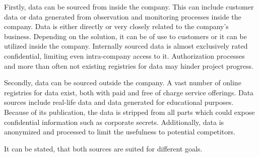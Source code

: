 	Firstly, data can be sourced from inside the company. This can include customer data or data generated from observation and monitoring processes inside the company. Data is either directly or very closely related to the company's business. Depending on the solution, it can be of use to customers or it can be utilized inside the company. Internally sourced data is almost exclusively rated confidential, limiting even intra-company access to it. Authorization processes and more than often not existing registries for data may hinder project progress.
	
	Secondly, data can be sourced outside the company. A vast number of online registries for data exist, both with paid and free of charge service offerings. Data sources include real-life data and data generated for educational purposes. Because of its publication, the data is stripped from all parts which could expose confidential information such as corporate secrets. Additionally, data is anonymized and processed to limit the usefulness to potential competitors.
	
	It can be stated, that both sources are suited for different goals. 
